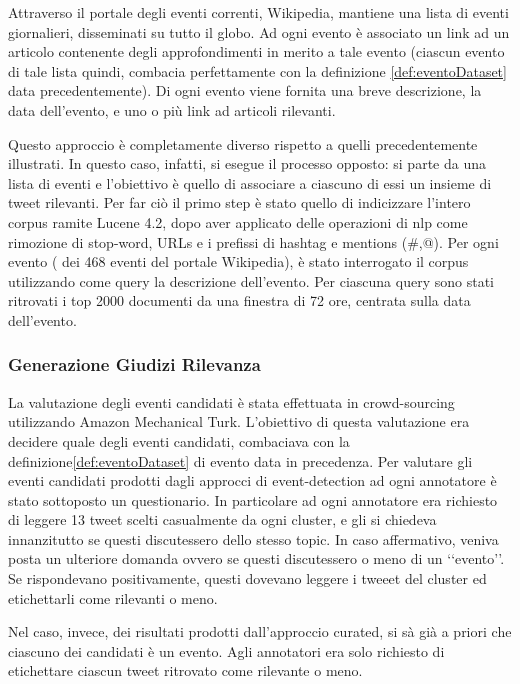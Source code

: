 Attraverso il portale degli eventi correnti, Wikipedia, mantiene una lista di eventi giornalieri, disseminati su tutto il globo. Ad ogni evento è associato un link ad un articolo contenente degli approfondimenti in merito a tale evento (ciascun evento di tale lista quindi, combacia perfettamente con la definizione \ref {def:eventoDataset} data precedentemente). 
Di ogni evento viene fornita una breve descrizione, la data dell'evento, e uno o più link ad articoli rilevanti. 

Questo approccio è completamente diverso rispetto a quelli precedentemente illustrati. In questo caso, infatti, si esegue il processo opposto: si parte da una lista di eventi e l'obiettivo è quello di associare a ciascuno di essi un insieme di tweet rilevanti.
Per far ciò il primo step è stato quello di indicizzare l'intero corpus ramite Lucene 4.2, dopo aver applicato delle operazioni di nlp come rimozione di stop-word, URLs e i prefissi di hashtag e mentions (\#,@). 
 Per ogni evento ( dei 468 eventi del portale Wikipedia), è stato interrogato il corpus utilizzando  come query la descrizione dell'evento. Per ciascuna query sono stati ritrovati i top 2000 documenti da una finestra di 72 ore, centrata sulla data dell'evento.
\subsubsection{Generazione Giudizi Rilevanza}
La valutazione degli eventi candidati è stata effettuata in crowd-sourcing utilizzando Amazon Mechanical Turk.
L'obiettivo di questa valutazione era decidere quale degli eventi candidati, combaciava con la definizione\ref{def:eventoDataset} di evento data in precedenza.
Per valutare gli eventi candidati prodotti dagli approcci di event-detection ad ogni annotatore è stato sottoposto un questionario.
In particolare ad ogni annotatore era richiesto di leggere 13 tweet scelti casualmente da ogni cluster, e gli si chiedeva innanzitutto se questi discutessero dello stesso topic. In caso affermativo, veniva posta un ulteriore domanda ovvero se questi discutessero o meno  di un \lq\lq evento\rq\rq. Se rispondevano positivamente, questi dovevano leggere i tweeet del cluster ed etichettarli come rilevanti o meno.


Nel caso, invece, dei risultati prodotti dall'approccio curated, si sà già a priori che ciascuno dei candidati è un evento. Agli annotatori era solo richiesto di etichettare ciascun tweet ritrovato come rilevante o meno.
 

